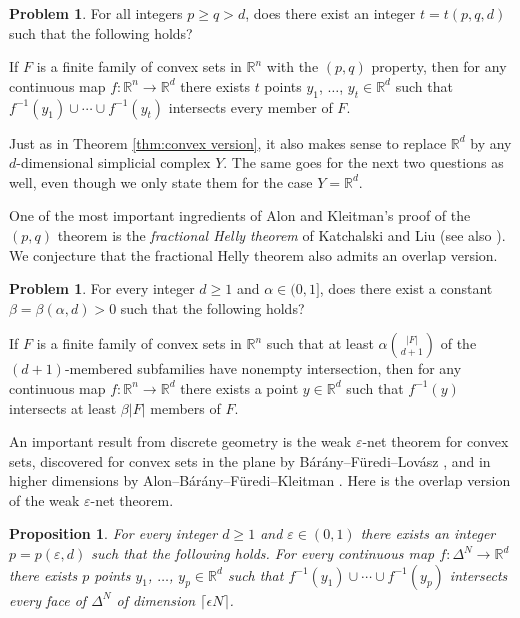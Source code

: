 \documentclass[12pt,a4paper,oneside]{amsart}\sloppy
\newtheorem{prop}[theorem]{Proposition}
\theoremstyle{definition}
\newtheorem{problem}[theorem]{Problem}
\newcommand{\inv}[1]{#1^{-1}}
\begin{document}
\begin{problem}\label{con:pq}
For all integers $p\geq q > d$, does there exist an integer $t = t(p,q,d)$ such that the following holds? 

If $F$ is a finite family of convex sets in $\mathbb{R}^n$ with the $(p,q)$ property, then for any continuous map $f: \mathbb{R}^n \to \mathbb{R}^d$ there exists $t$ points $y_1$, $\dots$, $y_t \in \mathbb{R}^d$ such that $\inv{f}(y_1) \cup \cdots \cup \inv{f}(y_t)$ intersects every member of $F$.  
\end{problem}

Just as in Theorem \ref{thm:convex version}, it also makes sense to replace $\mathbb{R}^d$ by any $d$-dimensional simplicial complex $Y$. The same goes for the next two questions as well, even though we only state them for the case $Y = \mathbb{R}^d$.

One of the most important ingredients of Alon and Kleitman's proof of the $(p,q)$ theorem is the \emph{fractional Helly theorem} of Katchalski and Liu \cite{KatchalskiLiu1979} (see also \cite{akmm, holmsen-lee}). We conjecture that the fractional Helly theorem also admits an overlap version. 

\begin{problem}\label{con:FracHelly}
For every integer $d\geq 1$ and $\alpha \in (0,1]$, does there exist a constant $\beta = \beta(\alpha, d) >0$ such that the following holds? 

If $F$ is a finite family of convex sets in $\mathbb{R}^n$ such that at least $\alpha \binom{|F|}{d+1}$ of the $(d+1)$-membered subfamilies have nonempty intersection, then for any continuous map $f \colon \mathbb{R}^n \to \mathbb{R}^d$ there exists a point $y\in \mathbb{R}^d$ such that  $\inv{f}(y)$ intersects at least $\beta|F|$ members of $F$.
\end{problem}

An important result from discrete geometry is the weak $\varepsilon$-net theorem for convex sets, discovered for convex sets in the plane by B{\'a}r{\'a}ny--F{\"u}redi--Lov{\'a}sz \cite{bfl}, and in higher dimensions by Alon--B{\'a}r{\'a}ny--F{\"u}redi--Kleitman \cite{abfk}. Here is the overlap version of the weak $\varepsilon$-net theorem.

\begin{prop}\label{prop:weak epsilon}
For every integer $d\geq 1$ and $\varepsilon \in (0,1)$ there exists an integer $p = p(\varepsilon, d)$ such that the following holds. For every continuous map $f : \Delta^N \to \mathbb{R}^d$ there exists $p$ points $y_1$, $\dots$, $y_p \in \mathbb{R}^d$ such that $\inv{f}(y_1) \cup \cdots \cup \inv{f}(y_p)$ intersects every face of $\Delta^N$ of dimension $\lceil \epsilon N \rceil$.
\end{prop}
\end{document}

